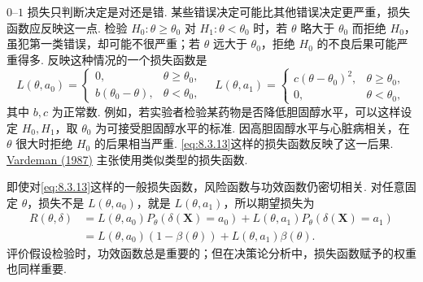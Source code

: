 $0$–$1$ 损失只判断决定是对还是错. 某些错误决定可能比其他错误决定更严重，损失函数应反映这一点. 检验 $H_0:\theta\ge\theta_0$ 对 $H_1:\theta<\theta_0$ 时，若 $\theta$ 略大于 $\theta_0$ 而拒绝 $H_0$，虽犯第一类错误，却可能不很严重；若 $\theta$ 远大于 $\theta_0$，拒绝 $H_0$ 的不良后果可能严重得多. 反映这种情况的一个损失函数是
\begin{equation}\label{eq:8.3.13}
L(\theta,a_0)=\begin{cases}0,&\theta\ge\theta_0,\\b(\theta_0-\theta),&\theta<\theta_0,\end{cases}
\quad L(\theta,a_1)=\begin{cases}c(\theta-\theta_0)^2,&\theta\ge\theta_0,\\0,&\theta<\theta_0,\end{cases}
\end{equation}
其中 $b,c$ 为正常数. 例如，若实验者检验某药物是否降低胆固醇水平，可以这样设定 $H_0,H_1$，取 $\theta_0$ 为可接受胆固醇水平的标准. 因高胆固醇水平与心脏病相关，在 $\theta$ 很大时拒绝 $H_0$ 的后果相当严重. \eqref{eq:8.3.13}这样的损失函数反映了这一后果. \hyperref[bib:source320]{Vardeman (1987)} 主张使用类似类型的损失函数.

即使对\eqref{eq:8.3.13}这样的一般损失函数，风险函数与功效函数仍密切相关. 对任意固定 $\theta$，损失不是 $L(\theta,a_0)$，就是 $L(\theta,a_1)$，所以期望损失为
\begin{equation}\label{eq:8.3.14}
\begin{aligned}
R(\theta,\delta)&=L(\theta,a_0)P_\theta(\delta(\boldsymbol X)=a_0)+L(\theta,a_1)P_\theta(\delta(\boldsymbol X)=a_1)\\
&=L(\theta,a_0)(1-\beta(\theta))+L(\theta,a_1)\beta(\theta).
\end{aligned}
\end{equation}
评价假设检验时，功效函数总是重要的；但在决策论分析中，损失函数赋予的权重也同样重要.
